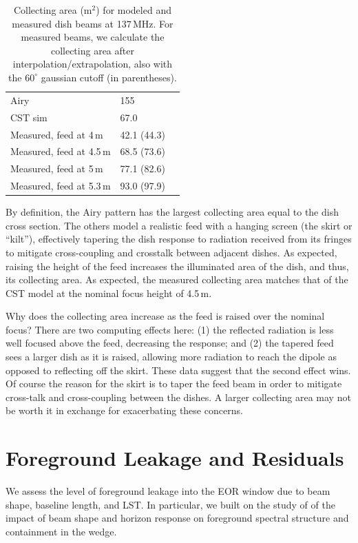 \documentclass{emulateapj}
\begin{document}
 \begin{table}[h]
 \caption{ \label{table:collectingareatable}Collecting area (m$^2$) for modeled and measured dish beams at 137\,MHz. For measured beams, we calculate the collecting area after interpolation/extrapolation, also with the $60^\circ$ gaussian cutoff (in parentheses).}
\begin{tabular}{| l | l | l |}
\hline
  Airy & 155\,  \\
  CST sim & 67.0\,  \\
  \hline
  Measured, feed at 4\,m & 42.1 (44.3) \\
  Measured, feed at 4.5\,m & 68.5 (73.6) \\ 
  Measured, feed at 5\,m & 77.1 (82.6) \\
  Measured, feed at 5.3\,m & 93.0 (97.9)\\
  \hline
\end{tabular}
\end{table}

By definition, the Airy pattern has the largest collecting area equal to the dish cross section. The others model a realistic feed with a hanging screen (the skirt or ``kilt''), effectively tapering the dish response to radiation received from its fringes to mitigate cross-coupling and crosstalk between adjacent dishes. As expected, raising the height of the feed increases the illuminated area of the dish, and thus, its collecting area. As expected, the measured collecting area matches that of the CST model at the nominal focus height of 4.5\,m.

Why does the collecting area increase as the feed is raised over the nominal focus? There are two computing effects here: (1) the reflected radiation is less well focused above the feed, decreasing the response; and (2) the tapered feed sees a larger dish as it is raised, allowing more radiation to reach the dipole as opposed to reflecting off the skirt. These data suggest that the second effect wins. Of course the reason for the skirt is to taper the feed beam in order to mitigate cross-talk and cross-coupling between the dishes. A larger collecting area may not be worth it in exchange for exacerbating these concerns.

\section{Foreground Leakage and Residuals}
\label{sec:foregroundleakage}

We assess the level of foreground leakage into the EOR window due to beam shape, baseline length, and LST. In particular, we built on the study of \citet{nithya15} of the impact of beam shape and horizon response on foreground spectral structure and containment in the wedge.
\end{document}
